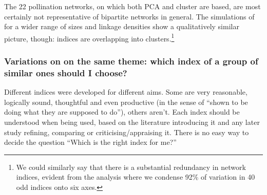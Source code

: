 \documentclass[a4paper, 11pt]{article}\usepackage[]{graphicx}\usepackage[]{color}
\begin{document}
The 22 pollination networks, on which both PCA and cluster are based, are most certainly not representative of bipartite networks in general. The simulations of \citet{Dormann2009} for a wider range of sizes and linkage densities show a qualitatively similar picture, though: indices are overlapping into clusters.\footnote{We could similarly say that there is a substantial redundancy in network indices, evident from the analysis where we condense 92\% of variation in 40 odd indices onto six axes.}



\subsubsection{Variations on on the same theme: which index of a group of similar ones should I choose?}


Different indices were developed for different aims. Some are very reasonable, logically sound, thoughtful and even productive (in the sense of ``shown to be doing what they are supposed to do''), others aren't. Each index should be understood when being used, based on the literature introducing it and any later study refining, comparing or criticising/appraising it. There is no easy way to decide the question ``Which is the right index for me?''
\end{document}
